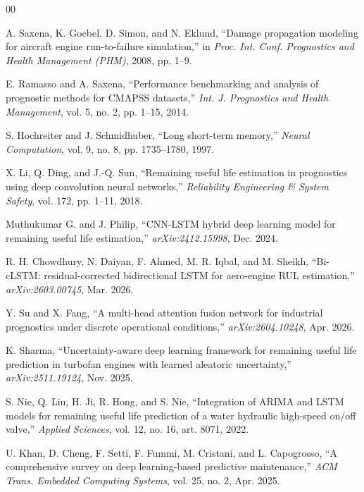 \documentclass[conference]{IEEEtran}
\begin{document}
\small
\begin{thebibliography}{00}

 A. Saxena, K. Goebel, D. Simon, and N. Eklund, ``Damage propagation modeling for aircraft engine run-to-failure simulation,'' in \emph{Proc. Int. Conf. Prognostics and Health Management (PHM)}, 2008, pp. 1--9.

 E. Ramasso and A. Saxena, ``Performance benchmarking and analysis of prognostic methods for CMAPSS datasets,'' \emph{Int. J. Prognostics and Health Management}, vol. 5, no. 2, pp. 1--15, 2014.

 S. Hochreiter and J. Schmidhuber, ``Long short-term memory,'' \emph{Neural Computation}, vol. 9, no. 8, pp. 1735--1780, 1997.

 X. Li, Q. Ding, and J.-Q. Sun, ``Remaining useful life estimation in prognostics using deep convolution neural networks,'' \emph{Reliability Engineering \& System Safety}, vol. 172, pp. 1--11, 2018.

 Muthukumar G. and J. Philip, ``CNN-LSTM hybrid deep learning model for remaining useful life estimation,'' \emph{arXiv:2412.15998}, Dec. 2024.

 R. H. Chowdhury, N. Daiyan, F. Ahmed, M. R. Iqbal, and M. Sheikh, ``Bi-cLSTM: residual-corrected bidirectional LSTM for aero-engine RUL estimation,'' \emph{arXiv:2603.00745}, Mar. 2026.

 Y. Su and X. Fang, ``A multi-head attention fusion network for industrial prognostics under discrete operational conditions,'' \emph{arXiv:2604.10248}, Apr. 2026.

 K. Sharma, ``Uncertainty-aware deep learning framework for remaining useful life prediction in turbofan engines with learned aleatoric uncertainty,'' \emph{arXiv:2511.19124}, Nov. 2025.

 S. Nie, Q. Liu, H. Ji, R. Hong, and S. Nie, ``Integration of ARIMA and LSTM models for remaining useful life prediction of a water hydraulic high-speed on/off valve,'' \emph{Applied Sciences}, vol. 12, no. 16, art. 8071, 2022.

 U. Khan, D. Cheng, F. Setti, F. Fummi, M. Cristani, and L. Capogrosso, ``A comprehensive survey on deep learning-based predictive maintenance,'' \emph{ACM Trans. Embedded Computing Systems}, vol. 25, no. 2, Apr. 2025.


\end{thebibliography}
\end{document}
